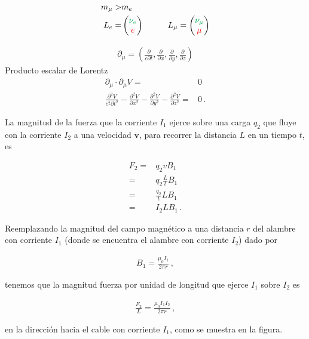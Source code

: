 \documentclass[11pt,a4paper]{article}
\begin{document}
\begin{align*}
m_\mu >& m_e\\
    L_e =&\begin{pmatrix}
      \color{Green}  \nu_e\\
       \color{red} e
    \end{pmatrix} \hspace{1cm}
    L_\mu= \begin{pmatrix}
      \color{Green}  \nu_\mu\\
       \color{red} \mu
    \end{pmatrix}
\end{align*}

\begin{align*}
    \partial_\mu = \left(\frac{\partial}{c\partial t},
    \frac{\partial}{\partial x},
    \frac{\partial}{\partial y},
    \frac{\partial}{\partial z}\right)
\end{align*}
\hspace{5cm}Producto escalar de Lorentz
\begin{align*}
    \partial_\mu\cdot \partial_\mu V =& 0\\ 
    \frac{\partial^2 V}{c^2\partial t^2}-
    \frac{\partial^2 V}{\partial x^2}-
    \frac{\partial^2 V}{\partial y^2}-
    \frac{\partial^2 V}{\partial z^2} =& 0\,.
\end{align*}

\newpage
\def\mipa{11cm}
\begin{minipage}{\mipa}
La magnitud de la fuerza que la corriente $I_1$ ejerce sobre una carga $q_2$ que fluye con la corriente $I_2$ a una velocidad $\boldsymbol{v}$, para recorrer la distancia $L$ en un tiempo $t$, es
\end{minipage}

\begin{align*}
F_2 =& q_2 v B_1\\
=& q_2\frac{L}{t} B_1\\
=& \frac{q_2}{t} L B_1\\
=& I_2 L B_1\,.
\end{align*}

\begin{minipage}{\mipa}
Reemplazando la magnitud del campo magnético 
a una distancia $r$ del alambre con corriente $I_1$ (donde se encuentra el alambre con corriente $I_2$) dado por
\end{minipage}

\begin{align*}
    B_1 = \frac{\mu_0 I_1}{2\pi r}\,,
\end{align*}

\begin{minipage}{\mipa}
tenemos que la magnitud fuerza por unidad de longitud que ejerce $I_1$ sobre $I_2$ es
\end{minipage}

\begin{align*}
    \frac{F_2}{L} = \frac{\mu_0 I_1 I_2}{2\pi r}\,,
\end{align*}

\begin{minipage}{\mipa}
en la dirección hacia el cable con corriente $I_1$, como se muestra en la figura.
\end{minipage}
\end{document}
